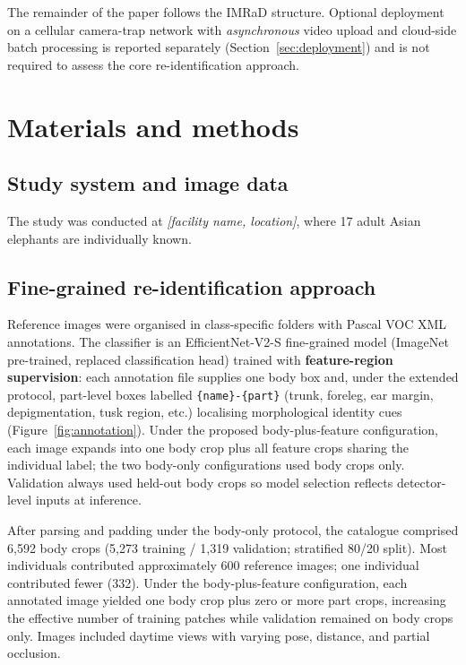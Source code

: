 \documentclass[preprint,12pt,3p,times]{elsarticle}
\begin{document}
The remainder of the paper follows the IMRaD structure. Optional deployment on a cellular camera-trap network with \emph{asynchronous} video upload and cloud-side batch processing is reported separately (Section~\ref{sec:deployment}) and is not required to assess the core re-identification approach.

\section{Materials and methods}
\label{sec:methods}

\subsection{Study system and image data}

The study was conducted at \textit{[facility name, location]}, where 17 adult Asian elephants are individually known.

\subsection{Fine-grained re-identification approach}

Reference images were organised in class-specific folders with Pascal VOC XML annotations. The classifier is an EfficientNet-V2-S fine-grained model (ImageNet pre-trained, replaced classification head) trained with \textbf{feature-region supervision}: each annotation file supplies one body box and, under the extended protocol, part-level boxes labelled \texttt{\{name\}-\{part\}} (trunk, foreleg, ear margin, depigmentation, tusk region, etc.) localising morphological identity cues (Figure~\ref{fig:annotation}). Under the proposed body-plus-feature configuration, each image expands into one body crop plus all feature crops sharing the individual label; the two body-only configurations used body crops only. Validation always used held-out body crops so model selection reflects detector-level inputs at inference.

After parsing and padding under the body-only protocol, the catalogue comprised 6{,}592 body crops (5{,}273 training / 1{,}319 validation; stratified 80/20 split). Most individuals contributed approximately 600 reference images; one individual contributed fewer (332). Under the body-plus-feature configuration, each annotated image yielded one body crop plus zero or more part crops, increasing the effective number of training patches while validation remained on body crops only. Images included daytime views with varying pose, distance, and partial occlusion.
\end{document}

